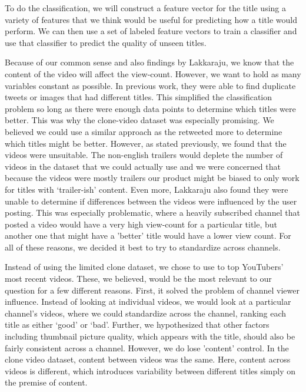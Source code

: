 \documentclass[a4paper,12pt]{article}
\begin{document}
To do the classification, we will construct a feature vector for the title using a variety of features that we think would be useful for predicting how a title would perform. We can then use a set of labeled feature vectors to train a classifier and use that classifier to predict the quality of unseen titles.

Because of our common sense and also findings by Lakkaraju, we know that the content of the video will affect the view-count. However, we want to hold as many variables constant as possible. In previous work, they were able to find duplicate tweets or images that had different titles. This simplified the classification problem so long as there were enough data points to determine which titles were better. This was why the clone-video dataset was especially promising. We believed we could use a similar approach as the retweeted more to determine which titles might be better. However, as stated previously, we found that the videos were unsuitable. The non-english trailers would deplete the number of videos in the dataset that we could actually use and we were concerned that because the videos were mostly trailers our product might be biased to only work for titles with `trailer-ish' content. Even more, Lakkaraju also found they were unable to determine if differences between the videos were influenced by the user posting. This was especially problematic, where a heavily subscribed channel that posted a video would have a very high view-count for a particular title, but another one that might have a 'better' title would have a lower view count. For all of these reasons, we decided it best to try to standardize across channels.

Instead of using the limited clone dataset, we chose to use to top YouTubers' most recent videos. These, we believed, would be the most relevant to our question for a few different reasons. First, it solved the problem of channel viewer influence. Instead of looking at individual videos, we would look at a particular channel's videos, where we could standardize across the channel, ranking each title as either `good' or `bad'. Further, we hypothesized that other factors including thumbnail picture quality, which appears with the title, should also be fairly consistent across a channel. However, we do lose 'content' control. In the clone video dataset, content between videos was the same. Here, content across videos is different, which introduces variability between different titles simply on the premise of content. 
\end{document}
